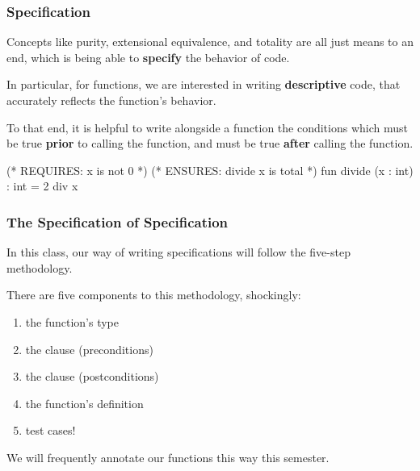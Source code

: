\documentclass[aspectratio=169]{beamer}
\begin{document}
\begin{frame}[fragile]
  \frametitle{Specification}

  Concepts like purity, extensional equivalence, and totality are all just means to
  an end, which is being able to \textbf{specify} the behavior of code.

  \pause
  \vspace{\fill}

  In particular, for functions, we are interested in writing \textbf{descriptive} code,
  that accurately reflects the function's behavior.
  
  \pause
  \vspace{5pt}

  To that end, it is helpful to write alongside a function the conditions which 
  must be true \textbf{prior} to calling the function, and must be true \textbf{after}
  calling the function.

  \pause
  \vspace{\fill}

  \begin{codeblock}
    (* REQUIRES: x is not 0 *)
    (* ENSURES: divide x is total *)
    fun divide (x : int) : int = 2 div x 
  \end{codeblock}

  \ptmt
\end{frame}

\begin{frame}[fragile]
  \frametitle{The Specification of Specification}

  In this class, our way of writing specifications will follow the 
  five-step methodology.

  \pause
  \vspace{\fill}

  There are five components to this methodology, shockingly:
  \pause
  \begin{enumerate}
    \item the function's type \pause
    \item the  clause (preconditions) \pause
    \item the  clause (postconditions) \pause
    \item the function's definition \pause
    \item test cases! \pause
  \end{enumerate}

  \vspace{\fill}

  We will frequently annotate our functions this way this semester.
\end{frame}
\end{document}
